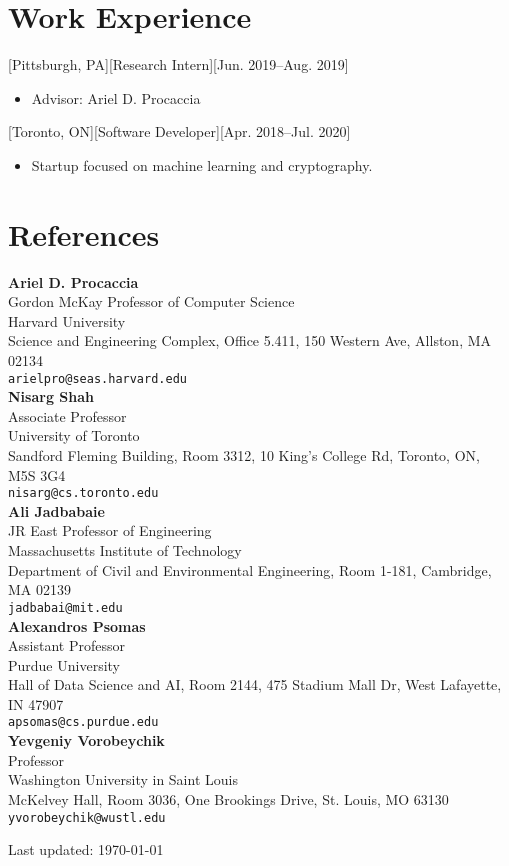 \documentclass{article}
\begin{document}
\section{Work Experience}
    [Pittsburgh, PA][Research Intern][Jun. 2019--Aug. 2019]
    \begin{itemize}[noitemsep,nolistsep]
        \item Advisor: Ariel D. Procaccia
    \end{itemize}
    [Toronto, ON][Software Developer][Apr. 2018--Jul. 2020]
    \begin{itemize}[noitemsep,nolistsep]
        \item Startup focused on machine learning and cryptography. 
    \end{itemize}

\section{References}

\noindent
\textbf{Ariel D. Procaccia} \\
Gordon McKay Professor of Computer Science \\
Harvard University \\
Science and Engineering Complex, Office 5.411, 150 Western Ave, Allston, MA 02134 \\
\texttt{arielpro@seas.harvard.edu} \\[0.8em]
\textbf{Nisarg Shah} \\
Associate Professor \\
University of Toronto \\
Sandford Fleming Building, Room 3312, 10 King's College Rd, Toronto, ON, M5S 3G4 \\
\texttt{nisarg@cs.toronto.edu} \\[0.8em]
\textbf{Ali Jadbabaie} \\
JR East Professor of Engineering \\
Massachusetts Institute of Technology \\
Department of Civil and Environmental Engineering, Room 1-181, Cambridge, MA 02139 \\
\texttt{jadbabai@mit.edu} \\[0.8em]
\textbf{Alexandros Psomas} \\
Assistant Professor \\
Purdue University \\
Hall of Data Science and AI, Room 2144, 475 Stadium Mall Dr, West Lafayette, IN 47907 \\
\texttt{apsomas@cs.purdue.edu} \\[0.8em]
\textbf{Yevgeniy Vorobeychik} \\
Professor \\
Washington University in Saint Louis \\
McKelvey Hall, Room 3036, One Brookings Drive, St. Louis, MO 63130 \\
\texttt{yvorobeychik@wustl.edu}


    \vfill
\begin{center}
    Last updated: \today
\end{center}
    
\end{document}
